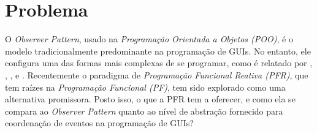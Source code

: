 \section{Problema}\label{lproblema}

O \emph{Observer Pattern}, usado na \emph{Programação Orientada
a Objetos (POO)}, é o modelo tradicionalmente predominante
na programação de GUIs.
No entanto, ele configura uma das formas mais complexas
de se programar, como é relatado por
,
,
,
e .
Recentemente o paradigma de \emph{Programação Funcional Reativa (PFR)},
que tem raízes na \emph{Programação Funcional (PF)},
tem sido explorado como uma alternativa promissora.
Posto isso, o que a PFR tem a oferecer, e como ela se compara ao
\emph{Observer Pattern} quanto ao nível de abstração fornecido para
coordenação de eventos na programação de GUIs?

%
%
%
